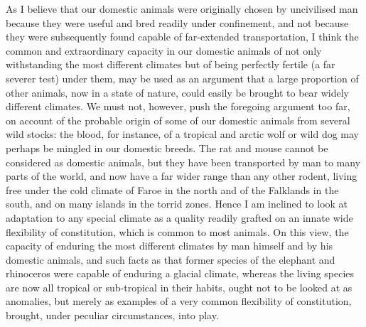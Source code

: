 As I believe that our domestic animals were originally chosen by uncivilised man because they were useful and bred readily under confinement, and not because they were subsequently found capable of far-extended transportation, I think the common and extraordinary capacity in our domestic animals of not only withstanding the most different climates but of being perfectly fertile (a far severer test) under them, may be used as an argument that a large proportion of other animals, now in a state of nature, could easily be brought to bear widely different climates. We must not, however, push the foregoing argument too far, on account of the probable origin of some of our domestic animals from several wild stocks: the blood, for instance, of a tropical and arctic wolf or wild dog may perhaps be mingled in our domestic breeds. The rat and mouse cannot be considered as domestic animals, but they have been transported by man to many parts of the world, and now have a far wider range than any other rodent, living free under the cold climate of Faroe in the north and of the Falklands in the south, and on many islands in the torrid zones. Hence I am inclined to look at adaptation to any special climate as a quality readily grafted on an innate wide flexibility of constitution, which is common to most animals. On this view, the capacity of enduring the most different climates by man himself and by his domestic animals, and such facts as that former species of the elephant and rhinoceros were capable of enduring a glacial climate, whereas the living species are now all tropical or sub-tropical in their habits, ought not to be looked at as anomalies, but merely as examples of a very common flexibility of constitution, brought, under peculiar circumstances, into play.
